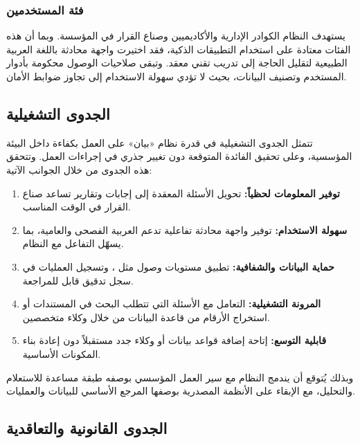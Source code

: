 \subsubsection{فئة المستخدمين}
\label{subsubsec:user-group-feasibility}

يستهدف النظام الكوادر الإدارية والأكاديميين وصناع القرار في المؤسسة. وبما أن هذه الفئات معتادة على استخدام التطبيقات الذكية، فقد اختيرت واجهة محادثة باللغة العربية الطبيعية لتقليل الحاجة إلى تدريب تقني معقد. وتبقى صلاحيات الوصول محكومة بأدوار المستخدم وتصنيف البيانات، بحيث لا تؤدي سهولة الاستخدام إلى تجاوز ضوابط الأمان.

\subsection{الجدوى التشغيلية}
\label{subsec:operational-feasibility}

تتمثل الجدوى التشغيلية في قدرة نظام «بيان» على العمل بكفاءة داخل البيئة المؤسسية، وعلى تحقيق الفائدة المتوقعة دون تغيير جذري في إجراءات العمل. وتتحقق هذه الجدوى من خلال الجوانب الآتية:

\begin{enumerate}[label=\textcolor{kauprimary}{\arabic*.},leftmargin=*,itemsep=6pt]
  \item \textbf{توفير المعلومات لحظياً:} تحويل الأسئلة المعقدة إلى إجابات وتقارير تساعد صناع القرار في الوقت المناسب.
  \item \textbf{سهولة الاستخدام:} توفير واجهة محادثة تفاعلية تدعم العربية الفصحى والعامية، بما يسهّل التفاعل مع النظام.
  \item \textbf{حماية البيانات والشفافية:} تطبيق مستويات وصول مثل ، وتسجيل العمليات في سجل تدقيق قابل للمراجعة.
  \item \textbf{المرونة التشغيلية:} التعامل مع الأسئلة التي تتطلب البحث في المستندات أو استخراج الأرقام من قاعدة البيانات من خلال وكلاء متخصصين.
  \item \textbf{قابلية التوسع:} إتاحة إضافة قواعد بيانات أو وكلاء جدد مستقبلاً دون إعادة بناء المكونات الأساسية.
\end{enumerate}

وبذلك يُتوقع أن يندمج النظام مع سير العمل المؤسسي بوصفه طبقة مساعدة للاستعلام والتحليل، مع الإبقاء على الأنظمة المصدرية بوصفها المرجع الأساسي للبيانات والعمليات.

\subsection{الجدوى القانونية والتعاقدية}
\label{subsec:legal-feasibility}

